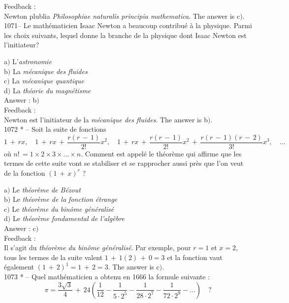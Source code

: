 ﻿\documentclass[letterpaper, 12pt]{article}
\begin{document}
Feedback : \\
Newton plublia {\sl Philosophiae naturalis principia mathematica}.
The answer is c$)$.\\

1071-- Le math\'ematicien Isaac Newton a beaucoup contribu\'e \`a la
physique. Parmi les choix suivants, lequel donne la branche de la
physique dont Isaac Newton est l'initiateur?

a$)$ L'{\sl astronomie} \\
b$)$ La {\sl m\'ecanique des fluides}  \\
c$)$ La {\sl m\'ecanique quantique}  \\
d$)$ La {\sl th\'eorie du magn\'etisme}\\

Answer : b$)$\\

Feedback : \\
Newton est l'initiateur de la {\sl m\'ecanique des fluides}.
The answer is b$)$.\\

1072 * -- Soit la suite de fonctions
$$\displaystyle{1\,+\,rx,\quad 1\,+\,rx\,+\,\frac{r(r\,-\,1)}{2!}x^2,\quad
1\,+\,rx\,+\,\frac{r(r\,-\,1)}{2!}x^2\,+\,\frac{r(r\,-\,1)(r\,-\,2)}{3!}x^3,\quad
\ldots}$$
o\`u $n!\,=1\times2\times3\times\ldots\times n$. Comment est
appel\'e le th\'eor\`eme qui affirme que les termes de cette suite
vont se stabiliser et se rapprocher aussi pr\`es que l'on veut de la
fonction $(1\,+\,x)^r$ ?

a$)$ Le {\sl th\'eor\`eme de B\'ezout} \\
b$)$ Le {\sl th\'eor\`eme de la fonction \'etrange}  \\
c$)$ Le {\sl th\'eor\`eme du bin\^ome g\'en\'eralis\'e}  \\
d$)$ Le {\sl th\'eor\`eme fondamental de l'alg\`ebre}\\

Answer : c$)$\\

Feedback : \\
Il s'agit du {\sl th\'eor\`eme du bin\^ome g\'en\'eralis\'e}. Par
exemple, pour $r=1$ et $x=2$, tous les termes de la suite valent
$1\,+\,1(2)\,+\,0=3$ et la fonction vaut \'egalement
$(1\,+\,2)^1=1\,+\,2=3$.
The answer is c$)$.\\

1073 * -- Quel math\'ematicien a obtenu en 1666 la formule suivante
:
$$\displaystyle{\pi=\frac{3\sqrt3}4\,+\,24\left(\frac1{12}-\frac1{5\cdot2^5}-\frac1{28\cdot2^7}-\frac1{72\cdot2^9}-\ldots\right)}\quad?$$
\end{document}
